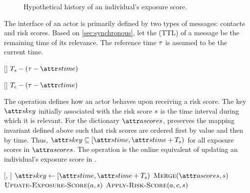 \begin{figure}[htbp]
\centering
{}
\caption[Historical exposure scores of an actor]{Hypothetical history of an individual's exposure score.}
\label{fig:exposure}
\end{figure}


The interface of an actor is primarily defined by two types of messages: contacts and risk scores. Based on \cref{sec:synchronous}, let the  (TTL) of a message be the remaining time of its relevance. The reference time $\tau$ is assumed to be the current time.

\begin{function}{\nRiskScoreTtl}[\vScore]
  \State \Return $\pScoreExpiry - (\vReferenceTime - \aScoreTime)$
\end{function}

\begin{function}{\nContactTtl}[\vContact]
  \State \Return $\pContactExpiry - (\vReferenceTime - \aContactTime)$
\end{function}

The \cHandleRiskScore operation defines how an actor behaves upon receiving a risk score. The key $\aScoreKey$ initially associated with the risk score $s$ is the time interval during which it is relevant. For the dictionary $\aActorScores$, \cMerge preserves the mapping invariant defined above such that risk scores are ordered first by value and then by time. Thus, $\aScoreKey \subseteq [\aScoreTime, \aScoreTime + \pScoreExpiry)$ for all exposure scores in $\aActorScores$. The \cUpdateExposureScore operation is the online equivalent of updating an individual's exposure score in \cRiskPropagation.

\begin{function}[H]{\nHandleRiskScore}[\vActor, \vScore]
    \State $\aScoreKey \assign [\aScoreTime, \aScoreTime + \pScoreExpiry)$
    \State $\cMerge[\aActorScores, \vScore]$
    \State $\cUpdateExposureScore[\vActor, \vScore]$
    \ForEach{$\vContact \in \aActorContacts$}
      \State $\cApplyRiskScore[\vActor, \vContact, \vScore]$
    \EndFor
  \EndIf
\end{function}

